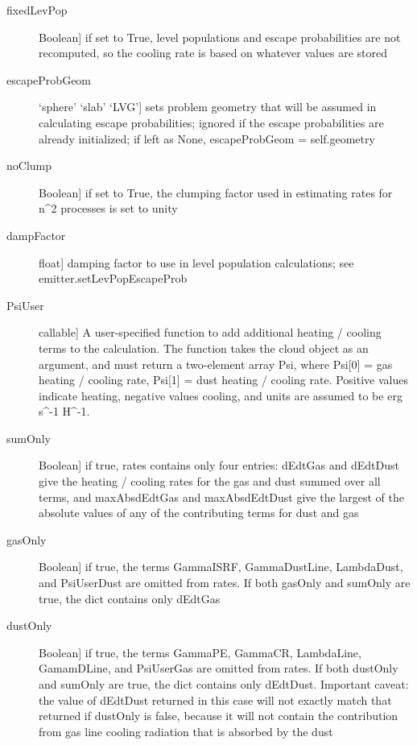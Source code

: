 \documentclass[letterpaper,10pt,english]{sphinxmanual}
\begin{document}
\begin{fulllineitems}
\begin{fulllineitems}
\begin{description}
\begin{description}
\item[{fixedLevPop}] \leavevmode{[}Boolean{]}
if set to True, level populations and escape
probabilities are not recomputed, so the cooling rate is
based on whatever values are stored

\item[{escapeProbGeom}] \leavevmode{[}`sphere' \textbar{} `slab' \textbar{} `LVG'{]}
sets problem geometry that will be assumed in calculating
escape probabilities; ignored if the escape probabilities
are already initialized; if left as None, escapeProbGeom
= self.geometry

\item[{noClump}] \leavevmode{[}Boolean{]}
if set to True, the clumping factor used in estimating
rates for n\textasciicircum{}2 processes is set to unity

\item[{dampFactor}] \leavevmode{[}float{]}
damping factor to use in level population calculations;
see emitter.setLevPopEscapeProb

\item[{PsiUser}] \leavevmode{[}callable{]}
A user-specified function to add additional heating /
cooling terms to the calculation. The function takes the
cloud object as an argument, and must return a two-element
array Psi, where Psi{[}0{]} = gas heating / cooling rate,
Psi{[}1{]} = dust heating / cooling rate. Positive values
indicate heating, negative values cooling, and units are
assumed to be erg s\textasciicircum{}-1 H\textasciicircum{}-1.

\item[{sumOnly}] \leavevmode{[}Boolean{]}
if true, rates contains only four entries: dEdtGas and
dEdtDust give the heating / cooling rates for the
gas and dust summed over all terms, and maxAbsdEdtGas and
maxAbsdEdtDust give the largest of the absolute values of
any of the contributing terms for dust and gas

\item[{gasOnly}] \leavevmode{[}Boolean{]}
if true, the terms GammaISRF, GammaDustLine, LambdaDust,               and PsiUserDust are omitted from rates. If both gasOnly
and sumOnly are true, the dict contains only dEdtGas

\item[{dustOnly}] \leavevmode{[}Boolean{]}
if true, the terms GammaPE, GammaCR, LambdaLine,
GamamDLine, and PsiUserGas are omitted from rates. If both
dustOnly and sumOnly are true, the dict contains only
dEdtDust. Important caveat: the value of dEdtDust returned
in this case will not exactly match that returned if
dustOnly is false, because it will not contain the
contribution from gas line cooling radiation that is
absorbed by the dust


\end{description}
\end{description}
\end{fulllineitems}
\end{fulllineitems}
\end{document}

